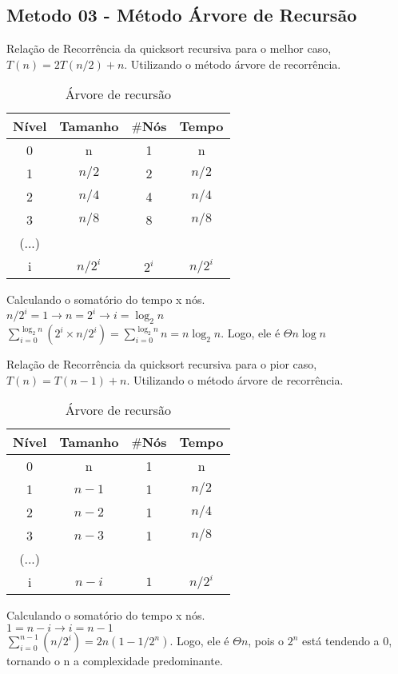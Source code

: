 \subsection{Metodo 03 - Método Árvore de Recursão}
Relação de Recorrência da quicksort recursiva para o melhor caso, $T(n) = 2T(n/2) + n$. Utilizando o método árvore de recorrência.

\begin{table}[ht!]
    \centering
    \begin{tabular}{|c|c|c|c|}
    \hline
    \textbf{Nível} & \textbf{Tamanho} & $\#$\textbf{Nós} & \textbf{Tempo} \\ \hline
     0 & n & 1 & n \\ \hline
     1 & $n/2$ & 2 & $n/2$ \\ \hline
     2 & $n/4$ & 4 & $n/4$ \\ \hline
     3 & $n/8$ & 8 & $n/8$ \\ \hline
     (...) & & & \\ \hline
     i & $n/2^i$ & $2^i$ & $n/2^i$ \\ \hline 
    \end{tabular}  
    \caption{Árvore de recursão}
\end{table}

Calculando o somatório do tempo x nós. \\
$n/2^i = 1 \rightarrow n = 2^i \rightarrow i = \log_2{n}$ \\
$\sum_{i=0}^{\log_2{n}} (2^i \times n/2^i) = \sum_{i=0}^{\log_2{n}} n = n \log_2{n}$. Logo, ele é $\Theta n \log{n}$ 

Relação de Recorrência da quicksort recursiva para o pior caso, $T(n) = T(n - 1) + n$. Utilizando o método árvore de recorrência.

\begin{table}[ht!]
    \centering
    \begin{tabular}{|c|c|c|c|}
    \hline
    \textbf{Nível} & \textbf{Tamanho} & $\#$\textbf{Nós} & \textbf{Tempo} \\ \hline
     0 & n & 1 & n \\ \hline
     1 & $n - 1$ & 1 & $n/2$ \\ \hline
     2 & $n - 2$ & 1 & $n/4$ \\ \hline
     3 & $n - 3$ & 1 & $n/8$ \\ \hline
     (...) & & & \\ \hline
     i & $n - i$ & $1$ & $n/2^i$ \\ \hline 
    \end{tabular}  
    \caption{Árvore de recursão}
\end{table}

Calculando o somatório do tempo x nós. \\
$1 = n -i \rightarrow i = n - 1$ \\
$\sum_{i = 0}^{n - 1} (n/2^i) = 2n(1 - 1/2^n)$. Logo, ele é $\Theta n$, pois o $2^n$ está tendendo a 0, tornando o n a complexidade predominante.